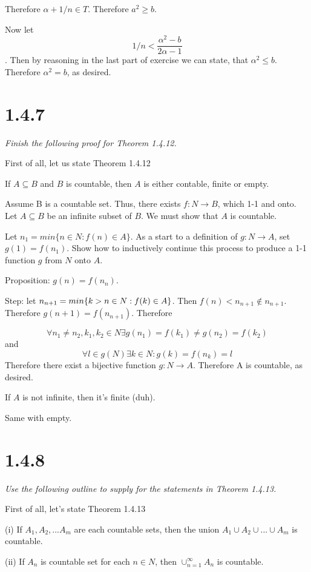 \documentclass[11pt,oneside,titlepage]{book}
\begin{document}
Therefore $\alpha + 1/n \in T$. Therefore $a^2 \geq b$.

Now let $$1/n < \frac{\alpha^2 - b}{2 \alpha -  1}$$. Then by reasoning in
the last part of exercise we can state, that $\alpha^2 \leq b$. Therefore
$\alpha^2 = b$, as desired.

\section*{1.4.7}
\textit{Finish the following proof for Theorem 1.4.12.}

First of all, let us state Theorem 1.4.12

If $A \subseteq B$ and $B$ is countable, then $A$ is either contable, finite
or empty.

Assume B is a countable set. Thus, there exists $f: N \to B$, which 1-1 and
onto. Let $A \subseteq B$ be an infinite subset of $B$. We must show that $A$
is countable.

Let $n_1 = min\{n \in N: f(n) \in A\}$. As a start to a definition of
$g: N \to A$, set $g(1) = f(n_1)$. Show how to inductively continue this
process to produce a 1-1 function $g$ from $N$ onto $A$.

Proposition: $g(n) = f(n_n)$.

Step: let $n_{n + 1} = min\{k > n \in N: f(k) \in A\text\}$. Then $f(n) <
n_{n+ 1} \notin n_{n + 1}$. Therefore $g(n + 1) = f(n_{n + 1})$. Therefore

$$\forall n_1 \neq n_2, k_1, k_2 \in N \exists g(n_1) = f(k_1)  \neq g(n_2) =
f(k_2)$$
and
$$\forall l \in g(N) \exists k \in N: g(k) = f(n_k) = l$$
Therefore there exist a bijective function $g: N \to A$. Therefore A is
countable, as desired.

If $A$ is not infinite, then it's finite (duh).

Same with empty.

\section*{1.4.8}
\textit{Use the following outline to supply for the statements in Theorem
  1.4.13.}

First of all, let's state Theorem 1.4.13

(i) If $A_1, A_2,...A_m$ are each countable sets, then the union
$A_1 \cup A_2 \cup ... \cup A_m$ is countable.

(ii) If $A_n$ is countable set for each $n \in N$, then $\cup^{\infty}_{n = 1}
A_n$ is countable.
\end{document}
